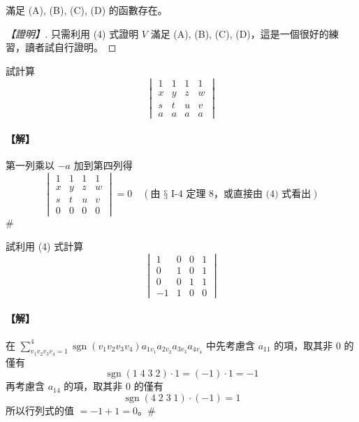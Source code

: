 \begin{theorem}\label{thm:b6s-1-11}
滿足 (A), (B), (C), (D) 的函數存在。
\end{theorem}

\begin{proof}[【證明】]
只需利用 (4) 式證明 $V$ 滿足 (A), (B), (C), (D)，這是一個很好的練習，讀者試自行證明。
\end{proof}

\begin{example}\label{ex:b6s-1-22}
試計算
\[ \begin{vmatrix}
1 & 1 & 1 & 1 \\
x & y & z & w \\
s & t & u & v \\
a & a & a & a
\end{vmatrix} \]
\end{example}

\paragraph{【解】}
第一列乘以 $-a$ 加到第四列得
\[ \begin{vmatrix}
1 & 1 & 1 & 1 \\
x & y & z & w \\
s & t & u & v \\
0 & 0 & 0 & 0
\end{vmatrix} = 0 \quad (\text{由 § I-4 定理 8，或直接由 (4) 式看出}) \]\hfill$\#$

\begin{example}\label{ex:b6s-1-23}
試利用 (4) 式計算
\[ \begin{vmatrix}
1 & 0 & 0 & 1 \\
0 & 1 & 0 & 1 \\
0 & 0 & 1 & 1 \\
-1 & 1 & 0 & 0
\end{vmatrix} \]
\end{example}

\paragraph{【解】}
在 $\sum_{v_1 v_2 v_3 v_4=1}^4 \operatorname{sgn}(v_1 v_2 v_3 v_4) a_{1v_1} a_{2v_2} a_{3v_3} a_{4v_4}$ 中先考慮含 $a_{11}$ 的項，取其非 0 的僅有
\[ \operatorname{sgn}(1 \; 4 \; 3 \; 2) \cdot 1 = (-1) \cdot 1 = -1 \]
再考慮含 $a_{14}$ 的項，取其非 0 的僅有
\[ \operatorname{sgn}(4 \; 2 \; 3 \; 1) \cdot (-1) = 1 \]
所以行列式的值 $=-1 + 1 = 0$。\hfill$\#$

